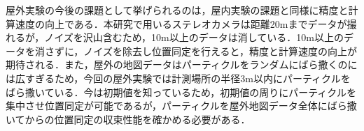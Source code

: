 屋外実験の今後の課題として挙げられるのは，屋内実験の課題と同様に精度と計算速度の向上である．本研究で用いるステレオカメラは距離20mまでデータが撮れるが，ノイズを沢山含むため，10m以上のデータは消している．10m以上のデータを消さずに，ノイズを除去し位置同定を行えると，精度と計算速度の向上が期待される．また，屋外の地図データはパーティクルをランダムにばら撒くのには広すぎるため，今回の屋外実験では計測場所の半径3m以内にパーティクルをばら撒いている．今は初期値を知っているため，初期値の周りにパーティクルを集中させ位置同定が可能であるが，パーティクルを屋外地図データ全体にばら撒いてからの位置同定の収束性能を確かめる必要がある．